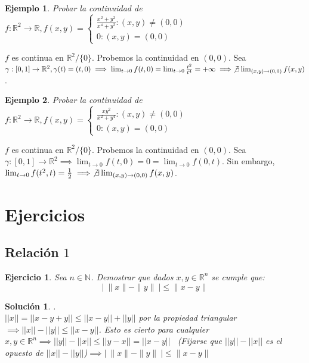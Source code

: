 \documentclass[11pt, a4paper]{article}
\makeatletter
\newif\IfInSansMode
\let\oldsf\sffamily
\renewcommand*{\sffamily}{\oldsf\mathversion{sans}\InSansModetrue}
\let\oldnorm\normalfont
\renewcommand*{\normalfont}{\oldnorm\InSansModefalse\mathversion{normal}}
\newcommand{\R}{\mathbb{R}} \newcommand{\N}{\mathbb{N}}
\renewenvironment{proof}[1][\proofname] {\par\pushQED{\qed}\normalfont\topsep6\p@\@plus6\p@\relax\trivlist\item[\hskip\labelsep\itshape\sffamily#1\@addpunct{.}]\ignorespaces}{\popQED\endtrivlist\@endpefalse}
\theoremstyle{theorem-style}
\theoremstyle{definition-style}
\newtheorem{ejer}{Ejercicio}[section]
\theoremstyle{remark-style}
\newtheorem*{sol}{Solución}
\theoremstyle{example-style}
\newtheorem{ejemplo}{Ejemplo}[section]
\makeatother
\begin{document}
\begin{ejemplo}
	Probar la continuidad de $ f: \R^2 \to \R, f(x,y) = \left\lbrace
	\begin{array}{ll}
	\frac{x^2+y^2}{x^4+y^2} : (x,y) \ne (0,0)\\
	0: (x,y) = (0,0)
	\end{array}
	\right.$
\end{ejemplo}

\begin{proof}
	$f$ es continua en $\R^2/\{0\}$. Probemos la continuidad en $(0,0)$. Sea $\gamma:[0,1] \to \R^2, \gamma(t) = (t,0) \implies \lim_{t \to 0} f(t,0) = \lim_{t \to 0}\frac{t^2}{t^4}= +\infty \implies \not\exists \lim_{(x,y) \to (0,0)} f(x,y)$.
\end{proof}

\begin{ejemplo}
	Probar la continuidad de $ f: \R^2 \to \R, f(x,y) = \left\lbrace
	\begin{array}{ll}
	\frac{xy^2}{x^2+y^4} : (x,y) \ne (0,0)\\
	0: (x,y) = (0,0)
	\end{array}
	\right.$
\end{ejemplo}

\begin{proof}
	$f$ es continua en $\R^2/\{0\}$. Probemos la continuidad en $(0,0)$. Sea $\gamma:[0,1] \to \R^2 \implies \lim_{t \to 0} f(t,0) = 0 = \lim_{t \to 0} f(0,t)$. Sin embargo, $\lim_{t \to 0} f(t^2,t)= \frac{1}{2} \implies \not\exists \lim_{(x,y) \to (0,0)} f(x,y)$.
\end{proof}








\section{Ejercicios}

\subsection{Relación $1$}

\begin{ejer}
Sea $n \in \N$. Demostrar que dados $x,y \in \R^n$ se cumple que:
$$ | \ \|x\| - \|y\| \ |  \le \|x-y\|$$
\end{ejer}

\begin{sol}.
\\ $ ||x|| = ||x-y+y|| \le ||x-y||+||y||$ por la propiedad triangular $ \implies  ||x||-||y|| \le ||x-y||$. Esto es cierto para cualquier $x,y \in \R^n \implies ||y||-||x|| \le ||y-x|| = ||x-y|| $ \ (Fijarse que $||y||-||x||$ es el opuesto de $||x||-||y||$)$ \implies | \ \|x\| - \|y\| \ |  \le \|x-y\|$
\end{sol}
\end{document}
